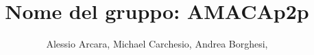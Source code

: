 \documentclass[a4paper, 12pt]{article}
\begin{document}
\title{Nome del gruppo: AMACAp2p}
\author{Alessio Arcara, Michael Carchesio, Andrea Borghesi,}


\maketitle

\newpage
\end{document}
